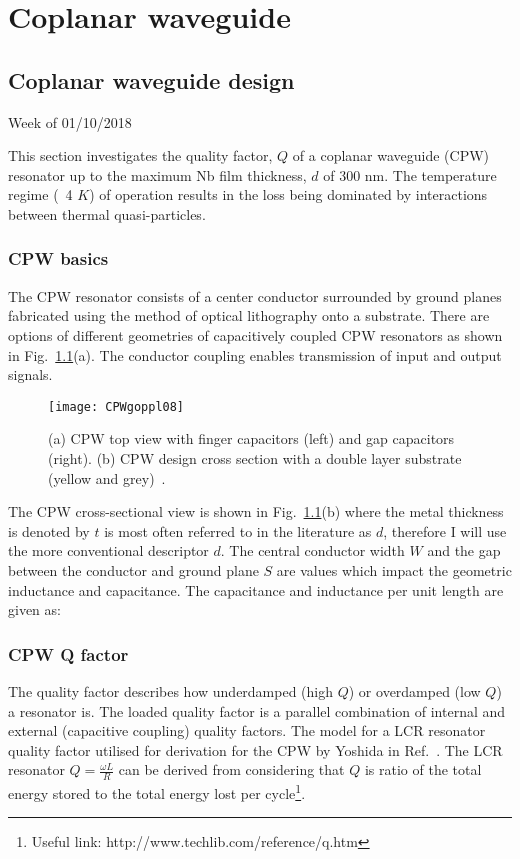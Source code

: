 \chapter{Coplanar waveguide}
\section{\label{sec:Coplanar Waveguide Design}Coplanar waveguide design}
Week of 01/10/2018

\noindent This section investigates the quality factor, $Q$ of a coplanar waveguide (CPW) resonator up to the maximum Nb film thickness, $d$ of 300 nm. The temperature regime (~4 $K$) of operation results in the loss being dominated by interactions between thermal quasi-particles.      

\subsection{CPW basics}

\noindent The CPW resonator consists of a center conductor surrounded by ground planes fabricated using the method of optical lithography onto a substrate. There are options of different geometries of capacitively coupled CPW resonators as shown in Fig.~\ref{fig:CPWgoppl08}(a). The conductor coupling enables transmission of input and output signals.

\begin{figure}[h]
\centering
\texttt{[image: CPWgoppl08]}
\caption{\label{fig:CPWgoppl08} (a) CPW top view with finger capacitors (left) and gap capacitors (right). (b) CPW design cross section with a double layer substrate (yellow and grey)~\citep{doi:10.1063/1.3010859}.}
\end{figure}

The CPW cross-sectional view is shown in Fig.~\ref{fig:CPWgoppl08}(b) where the metal thickness is denoted by $t$ is most often referred to in the literature as $d$, therefore I will use the more conventional descriptor $d$. The central conductor width $W$ and the gap between the conductor and ground plane $S$ are values which impact the geometric inductance and capacitance. The capacitance and inductance per unit length are given as:

  

\subsection{CPW Q factor}
The quality factor describes how underdamped (high $Q$) or overdamped (low $Q$) a resonator is. The loaded quality factor is a parallel combination of internal and external (capacitive coupling) quality factors. The model for a LCR resonator quality factor utilised for derivation for the CPW by Yoshida in Ref.~\citep{402973}. The LCR resonator $Q= \frac{\omega L}{R}$ can be derived from considering that $Q$ is ratio of the total energy stored to the total energy lost per cycle\footnote{Useful link: http://www.techlib.com/reference/q.htm}. 

